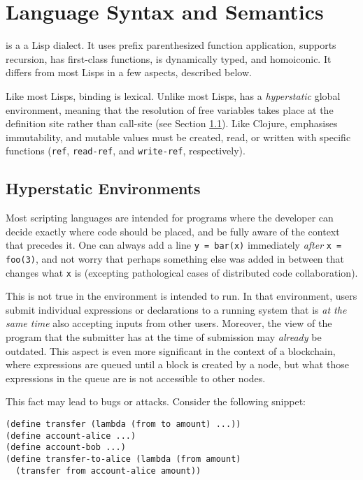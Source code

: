\section{Language Syntax and Semantics}
\label{s:language}

\rad is a a Lisp dialect. It uses prefix parenthesized function application,
supports recursion, has first-class functions, is dynamically typed, and
homoiconic. It differs from most Lisps in a few aspects, described below.

Like most Lisps, binding is lexical. Unlike most Lisps, \rad has a
\emph{hyperstatic} global environment, meaning that the resolution of free
variables takes place at the definition site rather than call-site (see Section
\ref{s:hyperstatic}). Like Clojure, \rad emphasises immutability, and mutable
values must be created, read, or written with specific functions (\texttt{ref},
\texttt{read-ref}, and \texttt{write-ref}, respectively).

\subsection{Hyperstatic Environments}
\label{s:hyperstatic}

Most scripting languages are intended for programs where the developer can
decide exactly where code should be placed, and be fully aware of the context
that precedes it. One can always add a line \texttt{y = bar(x)} immediately \textit{after}
\texttt{x = foo(3)}, and not worry that perhaps something else was added in
between that changes what \texttt{x} is (excepting pathological cases of
distributed code collaboration).

This is not true in the environment \rad is intended to run. In that
environment, users submit individual expressions or declarations to a running
system that is \emph{at the same time} also accepting inputs from other
users. Moreover, the view of the program that the submitter has at the time of
submission may \emph{already} be outdated. This aspect is even more significant
in the context of a blockchain, where expressions are queued until a block is
created by a node, but what those expressions in the queue are is not
accessible to other nodes.

This fact may lead to bugs or attacks. Consider the following snippet:

\begin{verbatim}
(define transfer (lambda (from to amount) ...))
(define account-alice ...)
(define account-bob ...)
(define transfer-to-alice (lambda (from amount)
  (transfer from account-alice amount))
\end{verbatim}

